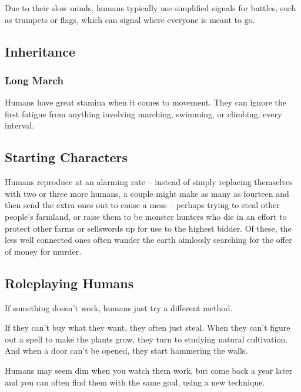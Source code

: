 \begin{multicols}{2}
Due to their slow minds, humans typically use simplified signals for battles, such as trumpets or flags, which can signal where everyone is meant to go.

\subsection{Inheritance}

\subsubsection[Long March: ignore first \glsentrytext{fatigue} from exercise]{Long March}
\label{humanInheritance}

Humans have great stamina when it comes to movement.
They can ignore the first \gls{fatigue} from anything involving marching, swimming, or climbing, every interval.

\subsection{Starting Characters}

Humans reproduce at an alarming rate -- instead of simply replacing themselves with two or three more humans, a couple might make as many as fourteen and then send the extra ones out to cause a mess -- perhaps trying to steal other people's farmland, or raise them to be monster hunters who die in an effort to protect other farms or sellswords up for use to the highest bidder.
Of these, the less well connected ones often wander the earth aimlessly searching for the offer of money for murder.

\subsection{Roleplaying Humans}

If something doesn't work, humans just try a different method.

If they can't buy what they want, they often just steal.
When they can't figure out a spell to make the plants grow, they turn to studying natural cultivation.
And when a door can't be opened, they start hammering the walls.

Humans may seem dim when you watch them work, but come back a year later and you can often find them with the same goal, using a new technique.


\end{multicols}

